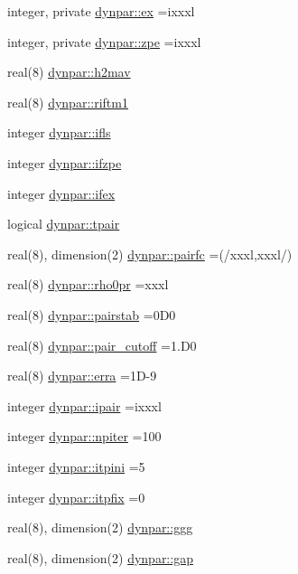 \begin{DoxyCompactItemize}
\item 
integer, private \hyperlink{namespacedynpar_acb60a62a18f7078e85a07b2ecf5a6494}{dynpar\+::ex} =ixxxl
\item 
integer, private \hyperlink{namespacedynpar_a51648067194ef0a15f4788803ad9dc15}{dynpar\+::zpe} =ixxxl
\item 
real(8) \hyperlink{namespacedynpar_ac33de9cee1beb56a87e03deca2c70612}{dynpar\+::h2mav}
\item 
real(8) \hyperlink{namespacedynpar_a5a55fded8acc95ce6310835c6917bb99}{dynpar\+::riftm1}
\item 
integer \hyperlink{namespacedynpar_a877470f2bcded7acda67b5c1cf9cca5c}{dynpar\+::ifls}
\item 
integer \hyperlink{namespacedynpar_a775e5f5a73d95413b3060b3a3416d348}{dynpar\+::ifzpe}
\item 
integer \hyperlink{namespacedynpar_a3d674134cccc9169245f519211dd8cd3}{dynpar\+::ifex}
\item 
logical \hyperlink{namespacedynpar_ae803e7e68e03a3afec51fc221aec9378}{dynpar\+::tpair}
\item 
real(8), dimension(2) \hyperlink{namespacedynpar_a851f888a2f9b400221d64c48005cb36a}{dynpar\+::pairfc} =(/xxxl,xxxl/)
\item 
real(8) \hyperlink{namespacedynpar_a14f4c76bd326e0be0d0b847314f439b9}{dynpar\+::rho0pr} =xxxl
\item 
real(8) \hyperlink{namespacedynpar_a4b2ad788ede529a0aa5eb57e0d0af8ce}{dynpar\+::pairstab} =0\+D0
\item 
real(8) \hyperlink{namespacedynpar_a9c3f1f575ac40a6f77dc8fe0b25b7de9}{dynpar\+::pair\+\_\+cutoff} =1.\+D0
\item 
real(8) \hyperlink{namespacedynpar_acfc09d77f0f8e8c7d7e8d35ba37d1183}{dynpar\+::erra} =1\+D-\/9
\item 
integer \hyperlink{namespacedynpar_a121a312e57301749fe811c37a646ffa7}{dynpar\+::ipair} =ixxxl
\item 
integer \hyperlink{namespacedynpar_aff25205e0d3d27dd13d9018690705300}{dynpar\+::npiter} =100
\item 
integer \hyperlink{namespacedynpar_afe6486ebd1f5ec51b5bd80422ee2bf9a}{dynpar\+::itpini} =5
\item 
integer \hyperlink{namespacedynpar_ad7ea186e7f9cdd4eeef2e37658dc4ec5}{dynpar\+::itpfix} =0
\item 
real(8), dimension(2) \hyperlink{namespacedynpar_a853bf04735807d2246a44c27a2cc0525}{dynpar\+::ggg}
\item 
real(8), dimension(2) \hyperlink{namespacedynpar_a35d2d18fbc60955048c9bd94d877fe33}{dynpar\+::gap}

\end{DoxyCompactItemize}
